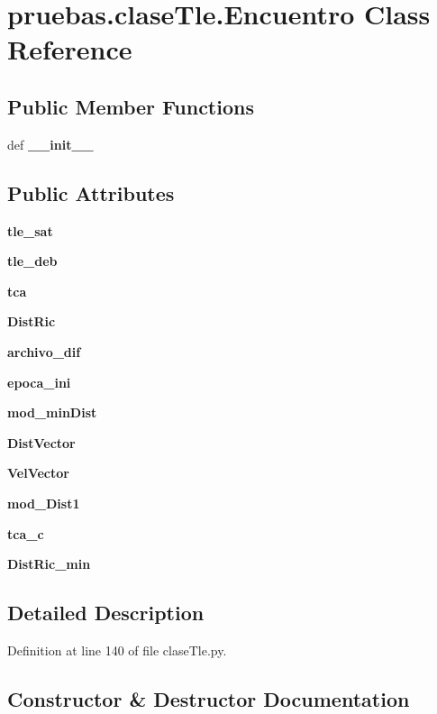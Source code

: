 \section{pruebas.\-clase\-Tle.\-Encuentro \-Class \-Reference}
\label{classpruebas_1_1clase_tle_1_1_encuentro}
\subsection*{\-Public \-Member \-Functions}
\begin{DoxyCompactItemize}
\item 
def {\bf \-\_\-\-\_\-init\-\_\-\-\_\-}
\end{DoxyCompactItemize}
\subsection*{\-Public \-Attributes}
\begin{DoxyCompactItemize}
\item 
{\bf tle\-\_\-sat}
\item 
{\bf tle\-\_\-deb}
\item 
{\bf tca}
\item 
{\bf \-Dist\-Ric}
\item 
{\bf archivo\-\_\-dif}
\item 
{\bf epoca\-\_\-ini}
\item 
{\bf mod\-\_\-min\-Dist}
\item 
{\bf \-Dist\-Vector}
\item 
{\bf \-Vel\-Vector}
\item 
{\bf mod\-\_\-\-Dist1}
\item 
{\bf tca\-\_\-c}
\item 
{\bf \-Dist\-Ric\-\_\-min}
\end{DoxyCompactItemize}


\subsection{\-Detailed \-Description}


\-Definition at line 140 of file clase\-Tle.\-py.



\subsection{\-Constructor \& \-Destructor \-Documentation}
